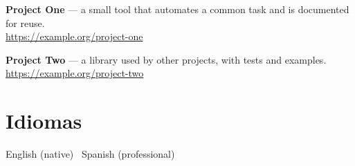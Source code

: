 \documentclass[11pt,a4paper]{article}
\newcommand{\lblLanguages}{Languages}
\renewcommand{\lblLanguages}{Idiomas}}
\begin{document}
  \textbf{Project One} --- a small tool that automates a common task and is
  documented for reuse.\\
  \url{https://example.org/project-one}

  \vspace{2pt}
  \textbf{Project Two} --- a library used by other projects, with tests and
  examples.\\
  \url{https://example.org/project-two}

  \section*{\lblLanguages}
  English (native) \textbar\ Spanish (professional)
\end{document}
